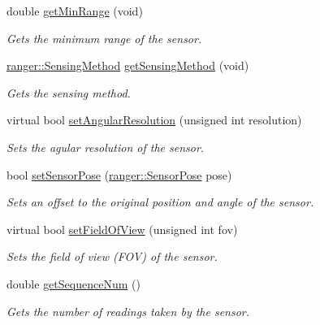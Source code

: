 \begin{DoxyCompactItemize}
double \hyperlink{classRanger_a646a06d3916179b9ebc4502bad169eec}{get\+Min\+Range} (void)
\begin{DoxyCompactList}\small\item\em Gets the minimum range of the sensor. \end{DoxyCompactList}\item 
\hyperlink{namespaceranger_ab04465c229cc50595ffe40a891a3b135}{ranger\+::\+Sensing\+Method} \hyperlink{classRanger_a47e30b7ec55adec5bb542278ccfee140}{get\+Sensing\+Method} (void)
\begin{DoxyCompactList}\small\item\em Gets the sensing method. \end{DoxyCompactList}\item 
virtual bool \hyperlink{classRanger_a3dc62dcba54eefbd7a0f08cbf97d87dc}{set\+Angular\+Resolution} (unsigned int resolution)
\begin{DoxyCompactList}\small\item\em Sets the agular resolution of the sensor. \end{DoxyCompactList}\item 
bool \hyperlink{classRanger_aa55ad45d83b8c095a495677ac8873f2b}{set\+Sensor\+Pose} (\hyperlink{structranger_1_1SensorPose}{ranger\+::\+Sensor\+Pose} pose)
\begin{DoxyCompactList}\small\item\em Sets an offset to the original position and angle of the sensor. \end{DoxyCompactList}\item 
virtual bool \hyperlink{classRanger_afb5d392ca450bcce295e61c121d09157}{set\+Field\+Of\+View} (unsigned int fov)
\begin{DoxyCompactList}\small\item\em Sets the field of view (F\+OV) of the sensor. \end{DoxyCompactList}\item 
double \hyperlink{classRanger_a35dfc3ff4e5c6c31a8625e972365006e}{get\+Sequence\+Num} ()
\begin{DoxyCompactList}\small\item\em Gets the number of readings taken by the sensor. \end{DoxyCompactList}\end{DoxyCompactItemize}
